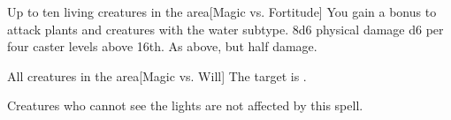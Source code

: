 \begin{spellheader}
\end{spellheader}
\begin{spelleffects}
    \begin{spelltargets}{Up to ten living creatures in the area}[Magic vs. Fortitude]
        \spellspecial You gain a  bonus to attack plants and creatures with the water subtype.
        \spellsuccess 8d6 physical damage \add d6 per four caster levels above 16th.
        \spellfailure As above, but half damage.
    \end{spelltargets}
\end{spelleffects}

\begin{spellheader}
    \spelldur{\durshort}
\end{spellheader}
\begin{spelleffects}
    \begin{spelltarget}{All creatures in the area}[Magic vs. Will]
        \spellsuccess The target is \fascinated.
    \end{spelltarget}
\end{spelleffects}
\begin{spellfooter}
    \spellnotes Creatures who cannot see the lights are not affected by this spell.
\end{spellfooter}

\begin{comment}
\subsubsection{I}
\end{comment}

